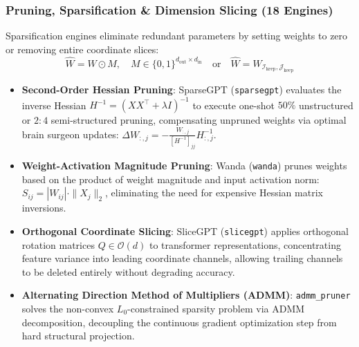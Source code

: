 \documentclass{article}
\begin{document}
\subsubsection{Pruning, Sparsification \& Dimension Slicing (18 Engines)}
Sparsification engines eliminate redundant parameters by setting weights to zero or removing entire coordinate slices:
\begin{equation}
    \hat{W} = W \odot M, \quad M \in \{0, 1\}^{d_{\text{out}} \times d_{\text{in}}} \quad \text{or} \quad \hat{W} = W_{\mathcal{I}_{\text{keep}}, \mathcal{J}_{\text{keep}}}
\end{equation}
\begin{itemize}
    \item \textbf{Second-Order Hessian Pruning}: SparseGPT (\texttt{sparsegpt}) \citep{frantar2022sparsegpt} evaluates the inverse Hessian $H^{-1} = (X X^\top + \lambda I)^{-1}$ to execute one-shot $50\%$ unstructured or $2:4$ semi-structured pruning, compensating unpruned weights via optimal brain surgeon updates: $\Delta W_{:, j} = -\frac{W_{:, j}}{[H^{-1}]_{jj}} H^{-1}_{:, j}$.
    \item \textbf{Weight-Activation Magnitude Pruning}: Wanda (\texttt{wanda}) \citep{sun2024wanda} prunes weights based on the product of weight magnitude and input activation norm: $S_{ij} = |W_{ij}| \cdot \|X_j\|_2$, eliminating the need for expensive Hessian matrix inversions.
    \item \textbf{Orthogonal Coordinate Slicing}: SliceGPT (\texttt{slicegpt}) \citep{ashkboos2024slicegpt} applies orthogonal rotation matrices $Q \in \mathcal{O}(d)$ to transformer representations, concentrating feature variance into leading coordinate channels, allowing trailing channels to be deleted entirely without degrading accuracy.
    \item \textbf{Alternating Direction Method of Multipliers (ADMM)}: \texttt{admm\_pruner} solves the non-convex $L_0$-constrained sparsity problem via ADMM decomposition, decoupling the continuous gradient optimization step from hard structural projection.
\end{itemize}
\end{document}
